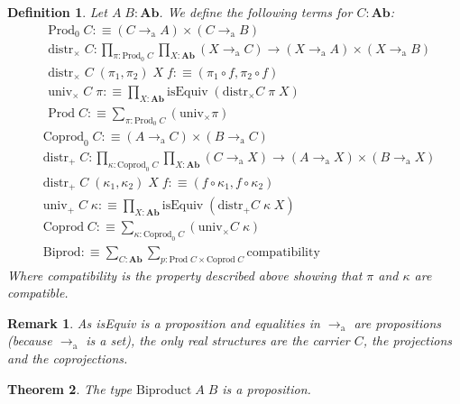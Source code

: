 \documentclass{article}
\newtheorem{defi}{Definition}
\newtheorem{them}[defi]{Theorem}
\newtheorem{rmk}{Remark}
\newcommand{\toa}[0]{\to_\mathrm a}
\begin{document}
\begin{defi}
    Let $A\;B : \textbf{Ab}$. We define the following terms for $C : \textbf{Ab}$:
    \begin{align*}
        &\mathrm{Prod}_0\;C :\equiv (C\toa A)\times (C\toa B)\\
        &\mathrm{distr}_\times\;C : \prod_{\pi : \mathrm{Prod}_0\;C} \prod_{X : \textbf{Ab}}
        (X\toa C) \to (X\toa A)\times (X\toa B)\\
        &\mathrm{distr}_\times \;C \; (\pi_1,\pi_2)\;X\;f :\equiv (\pi_1\circ f, \pi_2\circ f)\\
        &\mathrm{univ}_\times\;C\;\pi :\equiv \prod_{X : \textbf{Ab}} \mathrm{isEquiv}\;
        (\mathrm{distr}_\times C\;\pi\;X)\\
        &\mathrm{Prod}\;C : \equiv \sum_{\pi : \mathrm{Prod}_0\;C}(\mathrm{univ}_\times \pi)
    \end{align*}
    \begin{align*}
        &\mathrm{Coprod}_0\;C :\equiv (A\toa C)\times (B\toa C)\\
        &\mathrm{distr}_+\;C : \prod_{\kappa : \mathrm{Coprod}_0\;C} \prod_{X : \textbf{Ab}}
        (C\toa X) \to (A\toa X)\times (B\toa X)\\
        &\mathrm{distr}_+ \;C \; (\kappa_1,\kappa_2)\;X\;f :\equiv (f\circ\kappa_1, f\circ\kappa_2)\\
        &\mathrm{univ}_+\;C\;\kappa :\equiv \prod_{X : \textbf{Ab}} \mathrm{isEquiv}\;
        (\mathrm{distr}_+ C\;\kappa\;X)\\
        &\mathrm{Coprod}\;C : \equiv \sum_{\kappa : \mathrm{Coprod}_0\;C}(\mathrm{univ}_\times C\;\kappa)\\
        &\mathrm{Biprod} :\equiv \sum_{C : \textbf{Ab}}\sum_{p : \mathrm{Prod}\;C \times \mathrm{Coprod}\;C}
        \mathrm{compatibility}
    \end{align*}
    Where compatibility is the property described above showing that $\pi$ and $\kappa$ are compatible.
\end{defi}

\begin{rmk}
    As isEquiv is a proposition and equalities in $\toa$ are propositions (because $\toa$ is a set), the only
    real structures are the carrier $C$, the projections and the coprojections.
\end{rmk}

\begin{them}
    The type $\mathrm{Biproduct}\;A\;B$ is a proposition.
\end{them}
\end{document}
